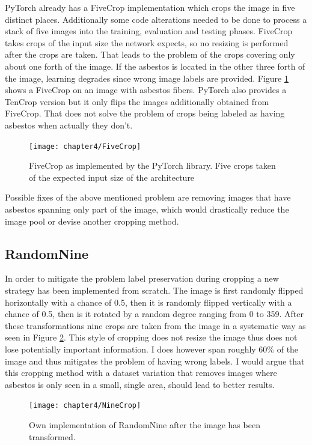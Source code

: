 PyTorch already has a FiveCrop implementation which crops the image in five distinct places. Additionally some code alterations needed to be done to process a stack of five images into the training, evaluation and testing phases. FiveCrop takes crops of the input size the network expects, so no resizing is performed after the crops are taken. That leads to the problem of the crops covering only about one forth of the image. If the asbestos is located in the other three forth of the image, learning degrades since wrong image labels are provided. Figure \ref{fig:FiveCrop} shows a FiveCrop on an image with asbestos fibers. PyTorch also provides a TenCrop version but it only flips the images additionally obtained from FiveCrop. That does not solve the problem of crops being labeled as having asbestos when actually they don't.

\begin{figure}[H]
  \centering
  \caption{FiveCrop as implemented by the PyTorch library. Five crops taken of the expected input size of the architecture}
  \texttt{[image: chapter4/FiveCrop]}
  \label{fig:FiveCrop}
\end{figure}

Possible fixes of the above mentioned problem are removing images that have asbestos spanning only part of the image, which would drastically reduce the image pool or devise another cropping method.

\subsection{RandomNine}

In order to mitigate the problem label preservation during cropping a new strategy has been implemented from scratch. The image is first randomly flipped horizontally with  a chance of 0.5, then it is randomly  flipped vertically with a chance of 0.5, then is it rotated by a random degree ranging from 0 to 359. After these transformations nine crops are taken from the image in a systematic way as seen in Figure \ref{fig:TenCrop}. This style of cropping does not resize the image thus does not lose potentially important information. I does however span roughly 60\% of the image and thus mitigates the problem of having wrong labels. I would argue that this cropping method with a dataset variation that  removes images where asbestos is only seen in a small, single area, should lead to better results.

\begin{figure}[H]
  \centering
  \caption{Own implementation of RandomNine after the image has been transformed.}
  \texttt{[image: chapter4/NineCrop]}
  \label{fig:TenCrop}
\end{figure}


